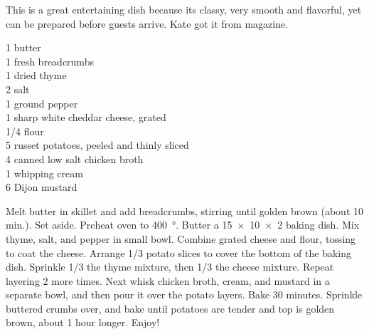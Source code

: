 \begin{open}
  This is a great entertaining dish because its classy, very smooth and
  flavorful, yet can be prepared before guests arrive. Kate got it from
   magazine.
\end{open}
\begin{ingredients}
  \SI{1}{\tblspoon} butter\\
  \SI{1}{\cup} fresh breadcrumbs\\
  \SI{1}{\tblspoon} dried thyme\\
  \SI{2}{\teaspoon} salt\\
  \SI{1}{\teaspoon} ground pepper\\
  \SI{1}{\pound} sharp white cheddar cheese, grated\\
  \SI{1/4}{\cup} flour\\
  \SI{5}{\pound} russet potatoes, peeled and thinly sliced\\
  \SI{4}{\cup} canned low salt chicken broth\\
  \SI{1}{\cup} whipping cream\\
  \SI{6}{\tblspoon} Dijon mustard
\end{ingredients}
Melt butter in skillet and add breadcrumbs, stirring until golden brown (about
10 min.). Set aside. Preheat oven to \SI{400}{\degree}. Butter a
\SI{15x10x2}{\inch} baking dish. Mix thyme, salt, and pepper in small
bowl. Combine grated cheese and flour, tossing to coat the cheese. Arrange
\num{1/3} potato slices to cover the bottom of the baking dish. Sprinkle
\num{1/3} the thyme mixture, then \num{1/3} the cheese mixture. Repeat
layering 2 more times.  Next whisk chicken broth, cream, and mustard in a
separate bowl, and then pour it over the potato layers. Bake 30
minutes. Sprinkle buttered crumbs over, and bake until potatoes are tender and
top is golden brown, about 1 hour longer.  Enjoy!

